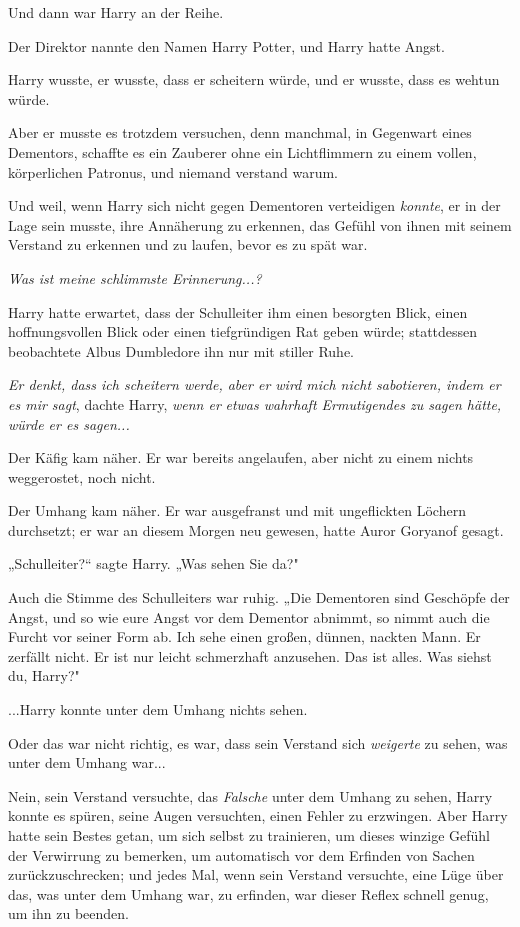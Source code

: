 {Und dann war Harry an der Reihe.

Der Direktor nannte den Namen Harry Potter, und Harry hatte Angst.

Harry wusste, er wusste, dass er scheitern würde, und er wusste, dass es wehtun würde.

Aber er musste es trotzdem versuchen, denn manchmal, in Gegenwart eines Dementors, schaffte es ein Zauberer ohne ein Lichtflimmern zu einem vollen, körperlichen Patronus, und niemand verstand warum.

Und weil, wenn Harry sich nicht gegen Dementoren verteidigen \emph{konnte}, er in der Lage sein musste, ihre Annäherung zu erkennen, das Gefühl von ihnen mit seinem Verstand zu erkennen und zu laufen, bevor es zu spät war.

\emph{\emph{Was ist meine schlimmste Erinnerung...?}}

Harry hatte erwartet, dass der Schulleiter ihm einen besorgten Blick, einen hoffnungsvollen Blick oder einen tiefgründigen Rat geben würde; stattdessen beobachtete Albus Dumbledore ihn nur mit stiller Ruhe.

\emph{Er denkt, dass ich scheitern werde, aber er wird mich nicht sabotieren, indem er es mir sagt}, dachte Harry, \emph{wenn er} \emph{etwas wahrhaft Ermutigendes zu sagen hätte, würde er es sagen...}

Der Käfig kam näher. Er war bereits angelaufen, aber nicht zu einem nichts weggerostet, noch nicht.

Der Umhang kam näher. Er war ausgefranst und mit ungeflickten Löchern durchsetzt; er war an diesem Morgen neu gewesen, hatte Auror Goryanof gesagt.

„Schulleiter?“ sagte Harry. „Was sehen Sie da?"

Auch die Stimme des Schulleiters war ruhig. „Die Dementoren sind Geschöpfe der Angst, und so wie eure Angst vor dem Dementor abnimmt, so nimmt auch die Furcht vor seiner Form ab. Ich sehe einen großen, dünnen, nackten Mann. Er zerfällt nicht. Er ist nur leicht schmerzhaft anzusehen. Das ist alles. Was siehst du, Harry?"

...Harry konnte unter dem Umhang nichts sehen.

Oder das war nicht richtig, es war, dass sein Verstand sich \emph{weigerte} zu sehen, was unter dem Umhang war...

Nein, sein Verstand versuchte, das \emph{Falsche} unter dem Umhang zu sehen, Harry konnte es spüren, seine Augen versuchten, einen Fehler zu erzwingen. Aber Harry hatte sein Bestes getan, um sich selbst zu trainieren, um dieses winzige Gefühl der Verwirrung zu bemerken, um automatisch vor dem Erfinden von Sachen zurückzuschrecken; und jedes Mal, wenn sein Verstand versuchte, eine Lüge über das, was unter dem Umhang war, zu erfinden, war dieser Reflex schnell genug, um ihn zu beenden.

}
